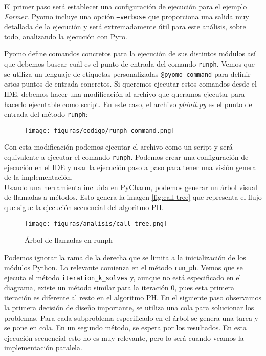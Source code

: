 El primer paso será establecer una configuración de ejecución para el ejemplo \textit{Farmer}. Pyomo incluye una opción \texttt{--verbose} que proporciona una salida muy detallada de la ejecución y será extremadamente útil para este análisis, sobre todo, analizando la ejecución con Pyro.

Pyomo define comandos concretos para la ejecución de sus distintos módulos así que debemos buscar cuál es el punto de entrada del comando \texttt{runph}. Vemos que se utiliza un lenguaje de etiquetas personalizadas \texttt{@pyomo\_command} para definir estos puntos de entrada concretos. Si queremos ejecutar estos comandos desde el IDE, debemos hacer una modificación al archivo que queramos ejecutar para hacerlo ejecutable como script. En este caso, el archivo \textit{phinit.py} es el punto de entrada del método \texttt{runph}:

\begin{figure}[H]
    \centerline{\texttt{[image: figuras/codigo/runph-command.png]}}
\end{figure}

Con esta modificación podemos ejecutar el archivo como un script y será equivalente a ejecutar el comando \texttt{runph}. Podemos crear una configuración de ejecución en el IDE y usar la ejecución paso a paso para tener una visión general de la implementación. \\

Usando una herramienta incluida en PyCharm, podemos generar un árbol visual de llamadas a métodos. Esto genera la imagen \autoref{fig:call-tree} que representa el flujo que sigue la ejecución secuencial del algoritmo PH.

\begin{figure}[]
    \centerline{\texttt{[image: figuras/analisis/call-tree.png]}}
    \caption{Árbol de llamadas en runph}
    \label{fig:call-tree}
\end{figure}

Podemos ignorar la rama de la derecha que se limita a la inicialización de los módulos Python. Lo relevante comienza en el método \texttt{run\_ph}. Vemos que se ejecuta el método \texttt{iteration\_k\_solves} y, aunque no está especificado en el diagrama, existe un método similar para la iteración 0, pues esta primera iteración es diferente al resto en el algoritmo PH.
En el siguiente paso observamos la primera decisión de diseño importante, se utiliza una cola para solucionar los problemas. Para cada subproblema especificado en el árbol se genera una tarea y se pone en cola. En un segundo método, se espera por los resultados. En esta ejecución secuencial esto no es muy relevante, pero lo será cuando veamos la implementación paralela.\\

